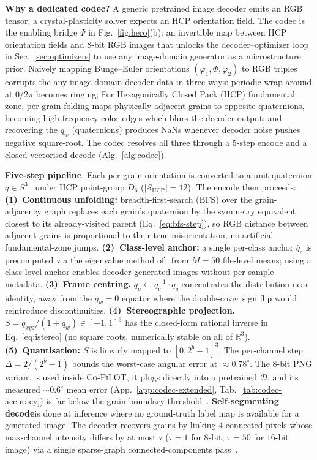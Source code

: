 \documentclass{article}
\newcommand{\Co}{\textsc{Co-PiLOT}}
\newcommand{\Dec}{\mathcal{D}}
\newcommand{\R}{\mathbb{R}}
\begin{document}
\textbf{Why a dedicated codec?} A generic pretrained image decoder emits an RGB tensor; a crystal-plasticity solver expects an HCP orientation field. The codec is the enabling bridge $\Psi$ in Fig.~\ref{fig:hero}(b): an invertible map between HCP orientation fields and 8-bit RGB images that unlocks the decoder--optimizer loop in Sec.~\ref{sec:optimizers} to use any image-domain generator as a microstructure prior. Naively mapping Bunge--Euler orientations $(\varphi_1, \Phi, \varphi_2)$ to RGB triples corrupts the any image-domain decoder data in three ways: periodic wrap-around at $0/2\pi$ becomes ringing; For Hexagonically Closed Pack (HCP) fundamental zone, per-grain folding maps physically adjacent grains to opposite quaternions, becoming high-frequency color edges which blurs the decoder output; and recovering the $q_w$ (quaternions) produces NaNs whenever decoder noise pushes negative square-root. The codec resolves all three through a 5-step encode and a closed vectorised decode (Alg.~\ref{alg:codec}).

\textbf{Five-step pipeline}. Each per-grain orientation is converted to a unit quaternion $q\in S^3$~\citep{zhou2019} under HCP point-group $D_6$ ($|\mathcal{S}_{\mathrm{HCP}}|=12$). The encode then proceeds:
\textbf{(1)~Continuous unfolding:} breadth-first-search (BFS) over the grain-adjacency graph replaces each grain's quaternion by the symmetry equivalent closest to its already-visited parent (Eq.~\ref{eq:bfs-step}), so RGB distance between adjacent grains is proportional to their true misorientation, no artificial fundamental-zone jumps.
\textbf{(2)~Class-level anchor:} a single per-class anchor $\bar q_c$ is precomputed via the eigenvalue method of~\citet{markley2007} from $M{=}50$ file-level means; using a class-level anchor enables decoder generated images without per-sample metadata.
\textbf{(3)~Frame centring.} $q_g\leftarrow \bar q_c^{-1}\cdot q_g$ concentrates the distribution near identity, away from the $q_w{=}0$ equator where the double-cover sign flip would reintroduce discontinuities.
\textbf{(4)~Stereographic projection.} $S = q_{xyz}/(1+q_w) \in [-1,1]^3$ has the closed-form rational inverse in Eq.~\ref{eq:istereo} (no square roots, numerically stable on all of $\R^3$).
\textbf{(5)~Quantisation:} $S$ is linearly mapped to $[0, 2^b{-}1]^3$. The per-channel step $\Delta = 2/(2^b{-}1)$ bounds the worst-case angular error at ${\approx}0.78^\circ$. The 8-bit PNG variant is used inside \Co{}, it plugs directly into a pretrained $\Dec$, and its measured ${\sim}0.6^\circ$ mean error (App.~\ref{app:codec-extended}, Tab.~\ref{tab:codec-accuracy}) is far below the grain-boundary threshold~\citep{readshockley1950}. \textbf{Self-segmenting decode}is done at inference where no ground-truth label map is available for a generated image. The decoder recovers grains by linking $4$-connected pixels whose max-channel intensity differs by at most $\tau$ ($\tau{=}1$ for $8$-bit, $\tau{=}50$ for $16$-bit image) via a single sparse-graph connected-components pass~\citep{groeber2014}.
\end{document}
